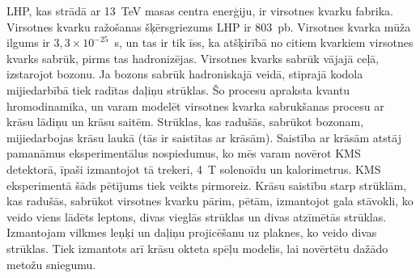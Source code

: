 LHP, kas strādā ar 13~TeV masas centra enerģiju, ir virsotnes kvarku fabrika. Virsotnes kvarku ražošanas šķērsgriezums LHP ir 803~pb. Virsotnes kvarka mūža ilgums ir $3,3\times10^{-25}$~s, un tas ir tik īss, ka atšķirībā no citiem kvarkiem virsotnes kvarks sabrūk, pirms tas hadronizējas. Virsotnes kvarks sabrūk vājajā ceļā, izstarojot \PW bozonu. Ja \PW bozons sabrūk hadroniskajā veidā, stiprajā kodola mijiedarbībā tiek radītas daļiņu strūklas. Šo procesu apraksta kvantu hromodinamika, un varam modelēt virsotnes kvarka sabrukšanas procesu ar krāsu lādiņu un krāsu saitēm. Strūklas, kas radušās, sabrūkot \PW bozonam, mijiedarbojas krāsu laukā (tās ir saistītas ar krāsām). Saistība ar krāsām atstāj pamanāmus eksperimentālus nospiedumus, ko mēs varam novērot KMS detektorā, īpaši izmantojot tā trekeri, 4~T solenoīdu un kalorimetrus. KMS eksperimentā šāds pētījums tiek veikts pirmoreiz. Krāsu saistību starp strūklām, kas radušās, sabrūkot virsotnes kvarku pārim, pētām, izmantojot gala stāvokli, ko veido viens lādēts leptons, divas vieglās strūklas un divas \cPqb atzīmētās strūklas. Izmantojam vilkmes leņķi un daļiņu projicēšanu uz plaknes, ko veido divas strūklas. Tiek izmantots arī krāsu okteta \PW spēļu modelis, lai novērtētu dažādo metožu sniegumu.
